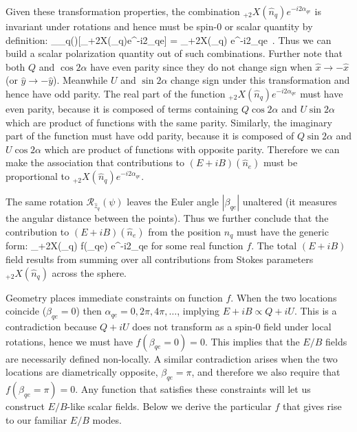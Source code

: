 Given these transformation properties, the combination ${}_{+2}X(\hat{n}_q)e^{-i2\alpha_{qe}}$ is invariant under rotations and hence must be spin-0 or scalar quantity by definition:
\beq
{}_{_q}(\psi)[{}_{+2}X(_q)e^{-i2\alpha_{qe}}] = {}_{+2}X(_q) e^{-i2\alpha_{qe}} \,. \label{eq:invariant}
\eeq
Thus we can build a scalar polarization quantity out of such combinations.
Further note that both $Q$ and $\cos2 \alpha$ have even parity since they do not change sign when $\hat{x} \rightarrow -\hat{x}$ (or $\hat{y} \rightarrow -\hat{y}$).  Meanwhile $U$ and $\sin 2 \alpha$ change sign under this transformation and hence have odd parity. The real part of the function  ${}_{+2}X(\hat{n}_q)e^{-i2\alpha_{qe}}$ must have even parity, because it is composed of terms containing $Q\cos{2\alpha}$ and  $U\sin{2 \alpha}$ which are product of functions with the same parity. Similarly, the imaginary part of the function must have odd parity, because it is composed of $Q\sin{2 \alpha}$ and $U\cos{2\alpha}$ which are product of functions with opposite parity.  Therefore we can make the association that contributions to  $(E+iB)(\hat n_e)$ must be proportional to $ {}_{+2}X(\hat{n}_q) e^{-i2\alpha_{qe}}$.


The same rotation $\mathcal{R}_{\hat{z}_q}(\psi)$ leaves the Euler angle $|\beta_{qe}|$ unaltered (it measures the angular distance between the points).  Thus we further conclude that the contribution to $(E+iB)(\hat n_e)$ from the position $\hat{n}_q$ must have the generic form:
\beq
{}_{+2}X(_q) f(\beta_{qe})  e^{-i2\alpha_{qe}}
\eeq
for some real function $f$. The total $(E+iB)$ field results from summing over all  contributions  from Stokes parameters ${}_{+2}X(\hat{n}_q)$ across the sphere.

Geometry places immediate constraints on function $f$.  When the two locations coincide ($\beta_{qe}=0$) then  $\alpha_{qe}=0,2\pi,4\pi,\dots$, implying $E + iB \propto Q+iU$.  This is a contradiction because $Q+iU$ does not transform as a spin-0 field under local rotations, hence we must have $f(\beta_{qe} = 0 ) = 0$. This implies that the $E/B$ fields are necessarily defined non-locally.  A similar contradiction arises when the two locations are diametrically opposite, $\beta_{qe} = \pi$, and therefore we also require that $f(\beta_{qe} = \pi ) = 0$.  Any function that satisfies these constraints will let us construct $E/B$-like scalar fields.   Below we derive the particular $f$ that gives rise to our familiar $E/B$ modes.

